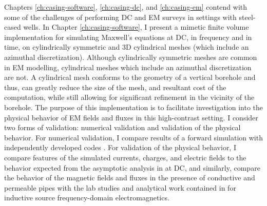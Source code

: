 Chapters \ref{ch:casing-software}, \ref{ch:casing-dc}, and \ref{ch:casing-em} contend with some of the challenges of performing DC and EM surveys in settings with steel-cased wells. In Chapter \ref{ch:casing-software}, I present a mimetic finite volume implementation for simulating Maxwell's equations at DC, in frequency and in time, on cylindrically symmetric and 3D cylindrical meshes (which include an azimuthal discretization). Although cylindrically symmetric meshes are common in EM modelling, cylindrical meshes which include an azimuthal discretization are not. A cylindrical mesh conforms to the geometry of a vertical borehole and thus, can greatly reduce the size of the mesh, and resultant cost of the computation, while still allowing for significant refinement in the vicinity of the borehole. The purpose of this implementation is to facilitate investigation into the physical behavior of EM fields and fluxes in this high-contrast setting. I consider two forms of validation: numerical validation and validation of the physical behavior. For numerical validation, I compare results of a forward simulation with independently developed codes \citep{Haber2007, Commer2015, Yang2016}. For validation of the physical behavior, I compare features of the simulated currents, charges, and electric fields to the behavior expected from the asymptotic analysis in \cite{Kaufman1990, Kaufman1993} at DC, and similarly, compare the behavior of the magnetic fields and fluxes in the presence of conductive and permeable pipes with the lab studies and analytical work contained in \cite{Augustin1989} for inductive source frequency-domain electromagnetics.

